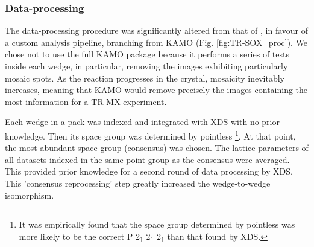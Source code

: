 \subsubsection{Data-processing}

The data-processing procedure was significantly altered from that of \cite{aumonierMillisecondTimeresolvedSerial2020}, in favour of a custom analysis pipeline, branching from KAMO \parencite{yamashitaKAMOAutomatedData2018} (Fig. \ref{fig:TR-SOX_proc}). We chose not to use the full KAMO package because it performs a series of tests inside each wedge, in particular, removing the images exhibiting particularly mosaic spots.  As the reaction progresses in the crystal, mosaicity inevitably increases, meaning that KAMO would remove precisely the images containing the most information for a TR-MX experiment. 

Each wedge in a pack was indexed and integrated with XDS \parencite{kabschXDS2010} with no prior knowledge. Then its space group was determined by pointless \parencite{evansIntroductionDataReduction2011} \footnote{It was empirically found that the space group determined by pointless was more likely to be the correct P 2\textsubscript{1} 2\textsubscript{1} 2\textsubscript{1} than that found by XDS.}. At that point, the most abundant space group (consensus) was chosen. The lattice parameters of all datasets indexed in the same point group as the consensus were averaged. This provided prior knowledge for a second round of data processing by XDS. This 'consensus reprocessing' step greatly increased the wedge-to-wedge isomorphism. 

